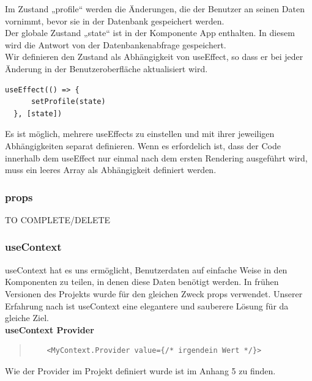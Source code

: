 Im Zustand „profile“ werden die Änderungen, die der Benutzer an seinen Daten vornimmt, bevor sie in der Datenbank gespeichert werden.
\\
Der globale Zustand „state“ ist in der Komponente App enthalten.
In diesem wird die Antwort von der Datenbankenabfrage gespeichert.
\\
Wir definieren den Zustand als Abhängigkeit von useEffect, so dass er bei jeder Änderung in der Benutzeroberfläche aktualisiert wird.
\\
\begin{lstlisting}
useEffect(() => { 
      setProfile(state)      
  }, [state])           
\end{lstlisting}

\begin{flushleft}
  Es ist möglich, mehrere useEffects zu einstellen und mit ihrer jeweiligen Abhängigkeiten separat definieren.
  Wenn es erfordelich ist, dass der Code innerhalb dem useEffect nur einmal nach dem ersten Rendering ausgeführt wird, muss ein leeres Array als Abhängigkeit definiert werden.
\end{flushleft}

\subsubsection{props}
TO COMPLETE/DELETE
\subsubsection{useContext}
useContext hat es uns ermöglicht, Benutzerdaten auf einfache Weise in den Komponenten zu teilen, in denen diese Daten benötigt werden. In frühen Versionen des Projekts wurde für den gleichen Zweck props verwendet.
Unserer Erfahrung nach ist useContext eine elegantere und sauberere Lösung für da gleiche Ziel.
\\
\textbf{useContext Provider} \\
\begin{quote}
  \begin{lstlisting}
    <MyContext.Provider value={/* irgendein Wert */}>
    \end{lstlisting}
  {\cite{R02}}

\end{quote}
Wie der Provider im Projekt definiert wurde ist im Anhang 5 zu finden.


